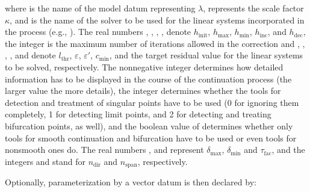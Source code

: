\documentclass[a4paper,11pt,english]{sphinxmanual}
\begin{document}
where  is the name of the model datum representing
\(\lambda\),  represents the scale factor \(\kappa\), and 
is the name of the solver to be used for the linear systems incorporated in the
process (e.g., ). The real numbers ,
, , ,  denote \(h_{\mathrm{init}}\),
\(h_{\mathrm{max}}\), \(h_{\mathrm{min}}\), \(h_{\mathrm{inc}}\),
and \(h_{\mathrm{dec}}\), the integer  is the maximum number of
iterations allowed in the correction and , , ,
, and  denote \(l_{\mathrm{thr}}\),
\(\varepsilon\), \(\varepsilon'\), \(c_{\mathrm{min}}\), and the
target residual value for the linear systems to be solved, respectively. The
non\sphinxhyphen{}negative integer  determines how detailed information has to be
displayed in the course of the continuation process (the larger value the more
details), the integer  determines whether the tools for
detection and treatment of singular points have to be used (0 for ignoring them
completely, 1 for detecting limit points, and 2 for detecting and treating
bifurcation points, as well), and the boolean value of  determines
whether only tools for smooth continuation and bifurcation have to be used
or even tools for non\sphinxhyphen{}smooth ones do. The real numbers ,
 and  represent \(\delta_{\mathrm{max}}\),
\(\delta_{\mathrm{min}}\) and \(\tau_{\mathrm{fac}}\), and the integers
 and  stand for \(n_{\mathrm{dir}}\) and
\(n_{\mathrm{span}}\), respectively.

Optionally, parameterization by a vector datum is then declared by:

\begin{sphinxVerbatim}[commandchars=\\\{\}]
  
\end{sphinxVerbatim}
\end{document}
